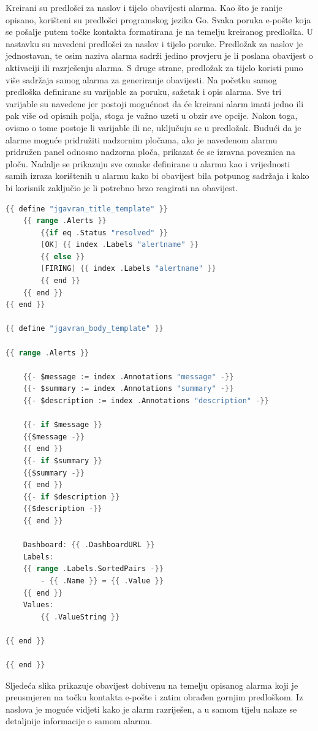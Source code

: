 Kreirani su predlošci za naslov i tijelo obavijesti alarma. Kao što je ranije opisano, korišteni su predlošci programskog jezika Go. Svaka poruka e-pošte koja se pošalje putem točke kontakta formatirana je na temelju kreiranog predloška. U nastavku su navedeni predlošci za naslov i tijelo poruke. Predložak za naslov je jednostavan, te osim naziva alarma sadrži jedino provjeru je li poslana obavijest o aktivaciji ili razrješenju alarma. S druge strane, predložak za tijelo koristi puno više sadržaja samog alarma za generiranje obavijesti. Na početku samog predloška definirane su varijable za poruku, sažetak i opis alarma. Sve tri varijable su navedene jer postoji mogućnost da će kreirani alarm imati jedno ili pak više od opisnih polja, stoga je važno uzeti u obzir sve opcije. Nakon toga, ovisno o tome postoje li varijable ili ne, uključuju se u predložak. Budući da je alarme moguće pridružiti nadzornim pločama, ako je navedenom alarmu pridružen panel odnosno nadzorna ploča, prikazat će se izravna poveznica na ploču. Nadalje se prikazuju sve oznake definirane u alarmu kao i vrijednosti samih izraza korištenih u alarmu kako bi obavijest bila potpunog sadržaja i kako bi korisnik zaključio je li potrebno brzo reagirati na obavijest.

\begin{lstlisting}[caption={Predlošci za naslov i tijelo obavijesti alarma}, language=go]
{{ define "jgavran_title_template" }}
	{{ range .Alerts }}
		{{if eq .Status "resolved" }}
		[OK] {{ index .Labels "alertname" }}
		{{ else }}
		[FIRING] {{ index .Labels "alertname" }}
		{{ end }}
	{{ end }}
{{ end }}

{{ define "jgavran_body_template" }}

{{ range .Alerts }}

	{{- $message := index .Annotations "message" -}}
	{{- $summary := index .Annotations "summary" -}}
	{{- $description := index .Annotations "description" -}}
	
	{{- if $message }}
	{{$message -}}
	{{ end }}
	{{- if $summary }}
	{{$summary -}}
	{{ end }}
	{{- if $description }}
	{{$description -}}
	{{ end }}
	
	Dashboard: {{ .DashboardURL }}
	Labels:
	{{ range .Labels.SortedPairs -}}
		- {{ .Name }} = {{ .Value }}
	{{ end }}
	Values:
		{{ .ValueString }}
	
{{ end }}

{{ end }}
\end{lstlisting}

Sljedeća slika prikazuje obavijest dobivenu na temelju opisanog alarma koji je preusmjeren na točku kontakta e-pošte i zatim obrađen gornjim predloškom. Iz naslova je moguće vidjeti kako je alarm razriješen, a u samom tijelu nalaze se detaljnije informacije o samom alarmu. 

